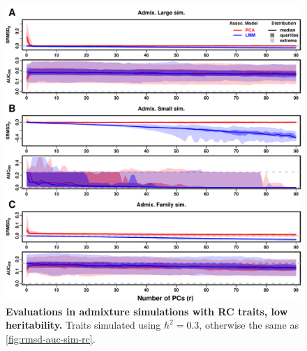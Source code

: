 \documentclass[11pt]{article}
\begin{document}
\begin{figure}[hp!]
  \centering
  \includegraphics[width=\textwidth,height=\textheight,keepaspectratio]{m_causal_fac-27/h0.3/rmsd-auc-sim.pdf}
  \caption{
    {\bf Evaluations in admixture simulations with RC traits, low heritability.}
    Traits simulated using $h^2=0.3$, otherwise the same as \cref{fig:rmsd-auc-sim-rc}.
  }
  \label{fig:rmsd-auc-sim-rc-h3}
\end{figure}
\end{document}
